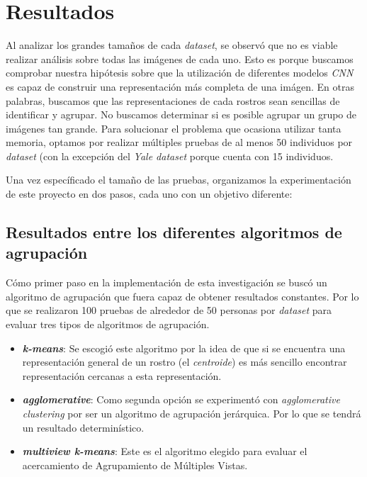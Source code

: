 \documentclass[letterpaper, 10 pt, conference]{ieeeconf}  %
\begin{document}
    \section{Resultados}
    Al analizar los grandes tamaños de cada \textit{dataset}, se observó que no es viable realizar
    análisis sobre todas las imágenes de cada uno. Esto es porque buscamos comprobar nuestra
    hipótesis sobre que la utilización de diferentes modelos \textit{CNN} es capaz de construir una
    representación más completa de una imágen. En otras palabras, buscamos que las representaciones
    de cada rostros sean sencillas de identificar y agrupar. No buscamos determinar si es posible
    agrupar un grupo de imágenes tan grande. Para solucionar el problema que ocasiona utilizar
    tanta memoria, optamos por realizar múltiples pruebas de al menos 50 individuos por
    \textit{dataset} (con la excepción del \textit{Yale dataset} porque cuenta con 15 individuos.

    Una vez específicado el tamaño de las pruebas, organizamos la experimentación de este proyecto
    en dos pasos, cada uno con un objetivo diferente:

    \subsection{Resultados entre los diferentes algoritmos de agrupación}
    Cómo primer paso en la implementación de esta investigación se buscó un algoritmo de agrupación
    que fuera capaz de obtener resultados constantes. Por lo que se realizaron 100 pruebas de
    alrededor de 50 personas por \textit{dataset} para evaluar tres tipos de algoritmos de
    agrupación.

    \begin{itemize}
        \item \textbf{\textit{k-means}}: Se escogió este algoritmo por la idea de que si se
            encuentra una representación general de un rostro (el \textit{centroide}) es más
            sencillo encontrar representación cercanas a esta representación.
        \item \textbf{\textit{agglomerative}}: Como segunda opción se experimentó con
            \textit{agglomerative clustering} por ser un algoritmo de agrupación jerárquica. Por lo
            que se tendrá un resultado determinístico.
        \item \textbf{\textit{multiview k-means}}: Este es el algoritmo elegido para evaluar el
            acercamiento de Agrupamiento de Múltiples Vistas.
    \end{itemize}
\end{document}

